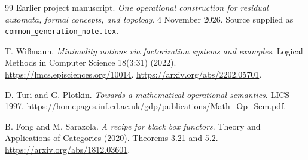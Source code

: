 \documentclass[11pt]{article}
\theoremstyle{definition}
\theoremstyle{remark}\newtheorem{remark}[theorem]{Remark}
\begin{document}
\begin{thebibliography}{99}
 Earlier project manuscript.
\emph{One operational construction for residual automata, formal concepts,
and topology}. 4 November 2026. Source supplied as
\texttt{common\_generation\_note.tex}.

 T. Wi\ss mann.
\emph{Minimality notions via factorization systems and examples}.
Logical Methods in Computer Science 18(3:31) (2022).
\url{https://lmcs.episciences.org/10014}.
\url{https://arxiv.org/abs/2202.05701}.

 D. Turi and G. Plotkin.
\emph{Towards a mathematical operational semantics}. LICS 1997.
\url{https://homepages.inf.ed.ac.uk/gdp/publications/Math_Op_Sem.pdf}.

 B. Fong and M. Sarazola.
\emph{A recipe for black box functors}. Theory and Applications of
Categories (2020). Theorems 3.21 and 5.2.
\url{https://arxiv.org/abs/1812.03601}.
\end{thebibliography}
\end{document}
